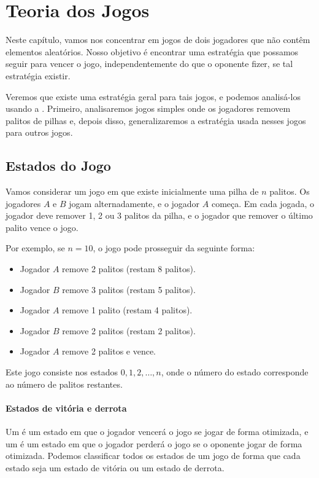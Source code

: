 \chapter{Teoria dos Jogos}

Neste capítulo, vamos nos concentrar em jogos de dois jogadores que não contêm elementos aleatórios. Nosso objetivo é encontrar uma estratégia que possamos seguir para vencer o jogo, independentemente do que o oponente fizer, se tal estratégia existir.

Veremos que existe uma estratégia geral para tais jogos, e podemos analisá-los usando a . Primeiro, analisaremos jogos simples onde os jogadores removem palitos de pilhas e, depois disso, generalizaremos a estratégia usada nesses jogos para outros jogos.

\section{Estados do Jogo}

Vamos considerar um jogo em que existe inicialmente uma pilha de $n$ palitos. Os jogadores $A$ e $B$ jogam alternadamente, e o jogador $A$ começa. Em cada jogada, o jogador deve remover 1, 2 ou 3 palitos da pilha, e o jogador que remover o último palito vence o jogo.

Por exemplo, se $n=10$, o jogo pode prosseguir da seguinte forma:
\begin{itemize}[noitemsep]
\item Jogador $A$ remove 2 palitos (restam 8 palitos).
\item Jogador $B$ remove 3 palitos (restam 5 palitos).
\item Jogador $A$ remove 1 palito (restam 4 palitos).
\item Jogador $B$ remove 2 palitos (restam 2 palitos).
\item Jogador $A$ remove 2 palitos e vence.
\end{itemize}

Este jogo consiste nos estados $0,1,2,\ldots,n$, onde o número do estado corresponde ao número de palitos restantes.

\subsubsection{Estados de vitória e derrota}


Um  é um estado em que o jogador vencerá o jogo se jogar de forma otimizada, e um  é um estado em que o jogador perderá o jogo se o oponente jogar de forma otimizada. Podemos classificar todos os estados de um jogo de forma que cada estado seja um estado de vitória ou um estado de derrota.

